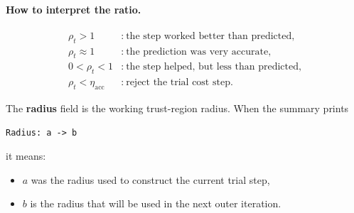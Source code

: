 \documentclass[11pt]{article}
\begin{document}
\paragraph{How to interpret the ratio.}
\begin{align*}
\rho_t > 1 &:\ \text{the step worked better than predicted,} \\
\rho_t \approx 1 &:\ \text{the prediction was very accurate,} \\
0 < \rho_t < 1 &:\ \text{the step helped, but less than predicted,} \\
\rho_t < \eta_{\mathrm{acc}} &:\ \text{reject the trial cost step.}
\end{align*}

The \textbf{radius} field is the working trust-region radius. When the summary
prints
\begin{verbatim}
Radius: a -> b
\end{verbatim}
it means:
\begin{itemize}
\item $a$ was the radius used to construct the current trial step,
\item $b$ is the radius that will be used in the next outer iteration.
\end{itemize}
\end{document}

